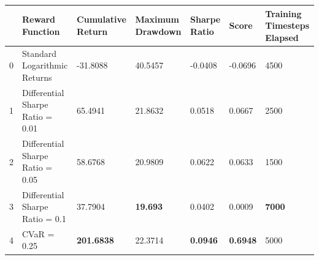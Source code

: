 \begin{tabular}{lllllll}
\toprule
 & Reward Function & Cumulative Return & Maximum Drawdown & Sharpe Ratio & Score & Training Timesteps Elapsed \\
\midrule
0 & Standard Logarithmic Returns & -31.8088 & 40.5457 & -0.0408 & -0.0696 & 4500 \\
1 & Differential Sharpe Ratio = 0.01 & 65.4941 & 21.8632 & 0.0518 & 0.0667 & 2500 \\
2 & Differential Sharpe Ratio = 0.05 & 58.6768 & 20.9809 & 0.0622 & 0.0633 & 1500 \\
3 & Differential Sharpe Ratio = 0.1 & 37.7904 & \textbf{19.693} & 0.0402 & 0.0009 & \textbf{7000} \\
4 & CVaR = 0.25 & \textbf{201.6838} & 22.3714 & \textbf{0.0946} & \textbf{0.6948} & 5000 \\
\bottomrule
\end{tabular}
